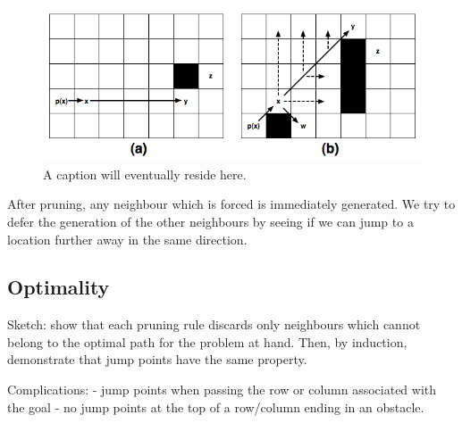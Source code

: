 

\begin{figure}[tb]
       \begin{center}
		   \includegraphics[scale=0.35, trim = 10mm 10mm 10mm 0mm]
			{diagrams/jumppoints.png}
       \end{center}
	\vspace{-3pt}
       \caption{A caption will eventually reside here.}
       \label{fig:jumppoints}
\end{figure}



After pruning, any neighbour which is forced is immediately generated.
We try to defer the generation of the other neighbours by seeing if we can 
jump to a location further away in the same direction.

\subsection{Optimality}
Sketch: show that each pruning rule discards only neighbours
which cannot belong to the optimal path for the problem at hand.
Then, by induction, demonstrate that jump points have the same 
property. 

Complications:
 - jump points when passing the row or column associated with the goal
 - no jump points at the top of a row/column ending in an obstacle.

